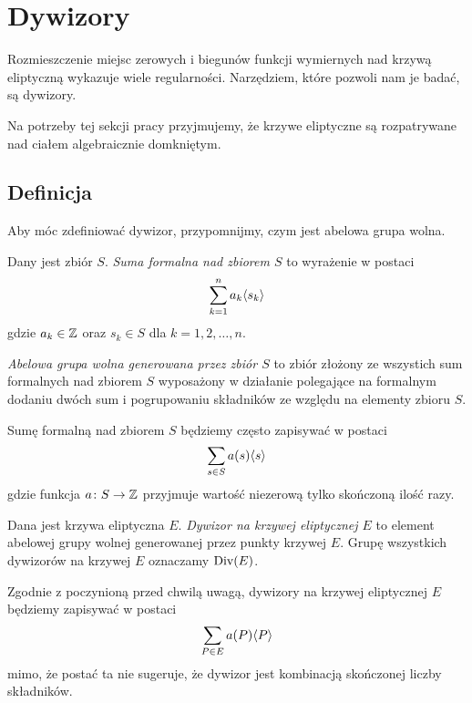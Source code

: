 \section{Dywizory}

Rozmieszczenie miejsc zerowych i biegunów
funkcji wymiernych nad krzywą eliptyczną
wykazuje wiele regularności.
Narzędziem, które pozwoli nam je badać, są dywizory.

Na potrzeby tej sekcji pracy przyjmujemy,
że krzywe eliptyczne są rozpatrywane nad ciałem algebraicznie domkniętym.

\subsection*{Definicja}

Aby móc zdefiniować dywizor,
przypomnijmy, czym jest abelowa grupa wolna.

\begin{definition}
Dany jest zbiór $S$.
\emph{Suma formalna nad zbiorem $S$} to wyrażenie w postaci
\begin{equation*}
\sum_{k=1}^n a_k\langle s_k\rangle
\end{equation*}
gdzie $a_k \in \mathbb{Z}$ oraz $s_k \in S$ dla $k = 1, 2, \ldots, n$.

\emph{Abelowa grupa wolna generowana przez zbiór $S$}
to zbiór złożony ze wszystich sum formalnych nad zbiorem $S$
wyposażony w działanie polegające na formalnym dodaniu dwóch sum
i pogrupowaniu składników ze względu na elementy zbioru $S$.
\end{definition}

\begin{remark}
Sumę formalną nad zbiorem $S$ będziemy często zapisywać w postaci
\begin{equation*}
\sum_{s \in S}a(s)\langle s\rangle
\end{equation*}
gdzie funkcja $a \colon S \to \mathbb{Z}$ przyjmuje wartość niezerową
tylko skończoną ilość razy.
\end{remark}

\begin{definition}
Dana jest krzywa eliptyczna $E$.
\emph{Dywizor na krzywej eliptycznej $E$}
to element abelowej grupy wolnej generowanej przez punkty krzywej $E$.
Grupę wszystkich dywizorów na krzywej $E$ oznaczamy $\operatorname{Div}(E)$.
\end{definition}

\begin{remark}
Zgodnie z poczynioną przed chwilą uwagą,
dywizory na krzywej eliptycznej $E$ będziemy zapisywać w postaci
\begin{equation*}
\sum_{P \in E} a(P)\langle P\rangle
\end{equation*}
mimo, że postać ta nie sugeruje,
że dywizor jest kombinacją skończonej liczby składników.
\end{remark}

